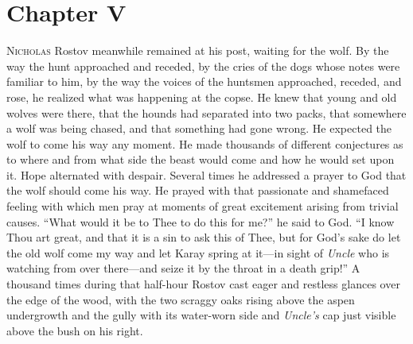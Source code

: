 
\chapter*{Chapter V}
\ifaudio     
{} 
\fi

\lettrine[lines=2, loversize=0.3, lraise=0]{\initfamily N}{icholas}
Rostov meanwhile remained at his post, waiting for the
wolf. By the way the hunt approached and receded, by the cries of
the dogs whose notes were familiar to him, by the way the voices
of the huntsmen approached, receded, and rose, he realized what
was happening at the copse. He knew that young and old wolves
were there, that the hounds had separated into two packs, that
somewhere a wolf was being chased, and that something had gone
wrong. He expected the wolf to come his way any moment. He made
thousands of different conjectures as to where and from what side
the beast would come and how he would set upon it. Hope
alternated with despair. Several times he addressed a prayer to
God that the wolf should come his way. He prayed with that
passionate and shamefaced feeling with which men pray at moments
of great excitement arising from trivial causes. ``What would it
be to Thee to do this for me?'' he said to God. ``I know Thou art
great, and that it is a sin to ask this of Thee, but for God's
sake do let the old wolf come my way and let Karay spring at
it---in sight of \emph{Uncle} who is watching from over
there---and seize it by the throat in a death grip!'' A thousand
times during that half-hour Rostov cast eager and restless
glances over the edge of the wood, with the two scraggy oaks
rising above the aspen undergrowth and the gully with its
water-worn side and \emph{Uncle's} cap just visible above the
bush on his right.

